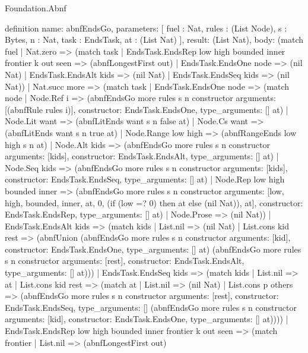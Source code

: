 \begin{lexlean}{Foundation.Abnf}
\begin{semanticmodule}
definition{
  name: abnfEndsGo,
  parameters: [
    fuel : Nat,
    rules : (List Node),
    s : Bytes,
    n : Nat,
    task : EndsTask,
    at : (List Nat)
  ],
  result: (List Nat),
  body: (match fuel
    | Nat.zero => (match task
      | EndsTask.EndsRep low high bounded inner frontier k out seen => (abnfLongestFirst out)
      | EndsTask.EndsOne node => (nil Nat)
      | EndsTask.EndsAlt kids => (nil Nat)
      | EndsTask.EndsSeq kids => (nil Nat))
    | Nat.succ more => (match task
      | EndsTask.EndsOne node => (match node
        | Node.Ref i => (abnfEndsGo more rules s n constructor{
          arguments: [(abnfRule rules i)],
          constructor: EndsTask.EndsOne,
          type_arguments: []
        } at)
        | Node.Lit want => (abnfLitEnds want s n false at)
        | Node.Cs want => (abnfLitEnds want s n true at)
        | Node.Range low high => (abnfRangeEnds low high s n at)
        | Node.Alt kids => (abnfEndsGo more rules s n constructor{
          arguments: [kids],
          constructor: EndsTask.EndsAlt,
          type_arguments: []
        } at)
        | Node.Seq kids => (abnfEndsGo more rules s n constructor{
          arguments: [kids],
          constructor: EndsTask.EndsSeq,
          type_arguments: []
        } at)
        | Node.Rep low high bounded inner => (abnfEndsGo more rules s n constructor{
          arguments: [low, high, bounded, inner, at, 0, (if (low =? 0) then at else (nil Nat)), at],
          constructor: EndsTask.EndsRep,
          type_arguments: []
        } at)
        | Node.Prose => (nil Nat))
      | EndsTask.EndsAlt kids => (match kids
        | List.nil => (nil Nat)
        | List.cons kid rest => (abnfUnion (abnfEndsGo more rules s n constructor{
          arguments: [kid],
          constructor: EndsTask.EndsOne,
          type_arguments: []
        } at) (abnfEndsGo more rules s n constructor{
          arguments: [rest],
          constructor: EndsTask.EndsAlt,
          type_arguments: []
        } at)))
      | EndsTask.EndsSeq kids => (match kids
        | List.nil => at
        | List.cons kid rest => (match at
          | List.nil => (nil Nat)
          | List.cons p others => (abnfEndsGo more rules s n constructor{
            arguments: [rest],
            constructor: EndsTask.EndsSeq,
            type_arguments: []
          } (abnfEndsGo more rules s n constructor{
            arguments: [kid],
            constructor: EndsTask.EndsOne,
            type_arguments: []
          } at))))
      | EndsTask.EndsRep low high bounded inner frontier k out seen => (match frontier
        | List.nil => (abnfLongestFirst out)
}
\end{semanticmodule}
\end{lexlean}
